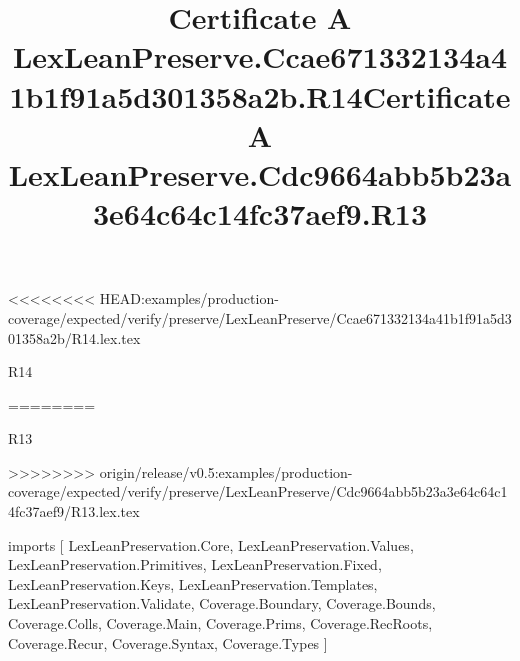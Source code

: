 <<<<<<<< HEAD:examples/production-coverage/expected/verify/preserve/LexLeanPreserve/Ccae671332134a41b1f91a5d301358a2b/R14.lex.tex
\begin{lexlean}{R14}
\title{Certificate A LexLeanPreserve.Ccae671332134a41b1f91a5d301358a2b.R14}
========
\begin{lexlean}{R13}
\title{Certificate A LexLeanPreserve.Cdc9664abb5b23a3e64c64c14fc37aef9.R13}
>>>>>>>> origin/release/v0.5:examples/production-coverage/expected/verify/preserve/LexLeanPreserve/Cdc9664abb5b23a3e64c64c14fc37aef9/R13.lex.tex
\begin{coremodule}
imports [
  LexLeanPreservation.Core,
  LexLeanPreservation.Values,
  LexLeanPreservation.Primitives,
  LexLeanPreservation.Fixed,
  LexLeanPreservation.Keys,
  LexLeanPreservation.Templates,
  LexLeanPreservation.Validate,
  Coverage.Boundary,
  Coverage.Bounds,
  Coverage.Colls,
  Coverage.Main,
  Coverage.Prims,
  Coverage.RecRoots,
  Coverage.Recur,
  Coverage.Syntax,
  Coverage.Types
]


\end{coremodule}
\end{lexlean}
\end{lexlean}
